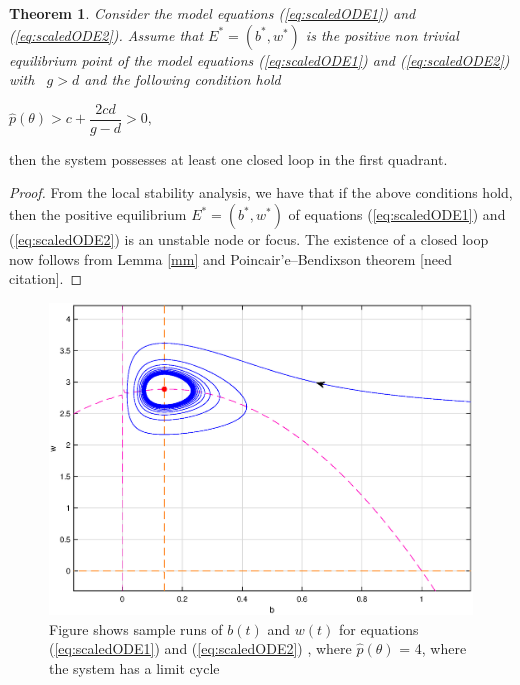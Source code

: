 \documentclass[12pt]{article}
\newtheorem{theorem}{Theorem}[section]
\begin{document}
\begin{theorem}
   Consider the model equations (\ref{eq:scaledODE1}) and
  (\ref{eq:scaledODE2}). Assume that $E^{\ast }=(b^{\ast },w^{\ast })$
  is the positive non trivial equilibrium point of the model equations
  (\ref{eq:scaledODE1}) and (\ref{eq:scaledODE2}) with \ $g>d$ and the
  following condition hold
\end{theorem}

\begin{center}
$%
\hat{p}(\theta )>c+\dfrac{2cd}{g-d}>0,$
\end{center}

then the system possesses at least one closed loop in the first quadrant.

\begin{proof}
  From the local stability analysis, we have that if the above
  conditions hold, then the positive equilibrium
  $E^{\ast }=(b^{\ast },w^{\ast })$ of equations (\ref{eq:scaledODE1})
  and (\ref{eq:scaledODE2}) is an unstable node or focus. The
  existence of a closed loop now follows from Lemma \ref{mm} and
  Poincair'e--Bendixson theorem [need citation].
\end{proof}

\begin{figure}[!htp]
\begin{center}
\includegraphics[scale=0.3]{img/lim.eps}  

\end{center}

\caption{Figure shows sample runs of $b(t)$ and $w(t)$ for equations
  (\ref{eq:scaledODE1}) and (\ref{eq:scaledODE2}) , where
  $\hat{p}(\theta )$ = 4, where the system has a limit cycle }
      \label{fig:lim}
\end{figure}
\end{document}
